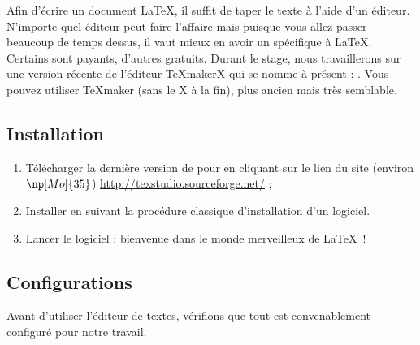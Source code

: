 Afin d'écrire un document \LaTeX, il suffit de taper le texte à l'aide d'un éditeur. N'importe quel éditeur peut faire l'affaire mais puisque vous allez passer beaucoup de temps dessus, il vaut mieux en avoir un spécifique à \LaTeX. Certains sont payants, d'autres gratuits. Durant le stage, nous travaillerons sur une version récente de l'éditeur {\sf TeXmakerX} qui se nomme à présent : \texstudio. Vous pouvez utiliser {\sf TeXmaker} (sans le {\sf X} à la fin), plus ancien mais très semblable.

\subsection{Installation}

\begin{enumerate}
    \item Télécharger la dernière version de \texstudio pour \windows en cliquant sur le lien du site (environ $\np[Mo]{35}$) \url{http://texstudio.sourceforge.net/} ;
    \item Installer \texstudio en suivant la procédure classique d'installation d'un logiciel.
    \item Lancer le logiciel : bienvenue dans le monde merveilleux de \LaTeX\ !

\end{enumerate}

\subsection{Configurations}
Avant d'utiliser l'éditeur de textes, vérifions que tout est convenablement configuré pour notre travail.

